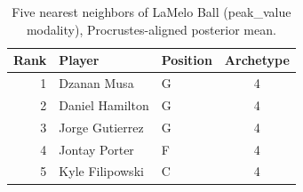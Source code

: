 \begin{table}[htbp]
  \centering\small
  \begin{tabular}{rllc}
    \toprule
    Rank & Player & Position & Archetype \\
    \midrule
    1 & Dzanan Musa & G & 4 \\
    2 & Daniel Hamilton & G & 4 \\
    3 & Jorge Gutierrez & G & 4 \\
    4 & Jontay Porter & F & 4 \\
    5 & Kyle Filipowski & C & 4 \\
    \bottomrule
  \end{tabular}
  \caption{Five nearest neighbors of LaMelo Ball (peak_value modality), Procrustes-aligned posterior mean.}
  \label{tab:LaMelo_Ball_neighbors_peak_value}
\end{table}

